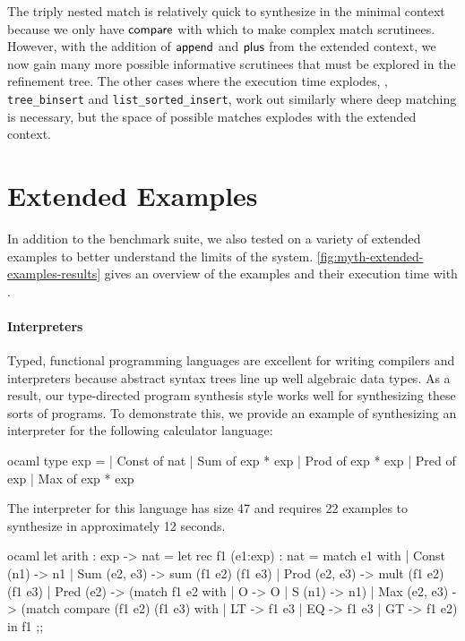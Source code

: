 The triply nested match is relatively quick to synthesize in the minimal context because we only have $\mathsf{compare}$ with which to make complex match scrutinees.
However, with the addition of $\mathsf{append}$ and $\mathsf{plus}$ from the extended context, we now gain many more possible informative scrutinees that must be explored in the refinement tree.
The other cases where the execution time explodes, \eg, \texttt{tree\_binsert} and \texttt{list\_sorted\_insert}, work out similarly where deep matching is necessary, but the space of possible matches explodes with the extended context.

\section{Extended Examples}
\label{sec:extended-examples}



In addition to the benchmark suite, we also tested \myth{} on a variety of extended examples to better understand the limits of the system.
\autoref{fig:myth-extended-examples-results} gives an overview of the examples and their execution time with \myth{}.

\paragraph{Interpreters}

Typed, functional programming languages are excellent for writing compilers and interpreters because abstract syntax trees line up well algebraic data types.
As a result, our type-directed program synthesis style works well for synthesizing these sorts of programs.
To demonstrate this, we provide an example of synthesizing an interpreter for the following calculator language:

\begin{center}
  \begin{cminted}{ocaml}
type exp =
| Const of nat
| Sum of exp * exp
| Prod of exp * exp
| Pred of exp
| Max of exp * exp
  \end{cminted}
\end{center}

The interpreter for this language has size 47 and requires 22 examples to synthesize in approximately 12 seconds.

\begin{center}
  \begin{cminted}{ocaml}
let arith : exp -> nat =
  let rec f1 (e1:exp) : nat =
    match e1 with
      | Const (n1) -> n1
      | Sum (e2, e3) -> sum (f1 e2) (f1 e3)
      | Prod (e2, e3) -> mult (f1 e2) (f1 e3)
      | Pred (e2) -> (match f1 e2 with
                        | O -> O
                        | S (n1) -> n1)
      | Max (e2, e3) -> (match compare (f1 e2) (f1 e3) with
                           | LT -> f1 e3
                           | EQ -> f1 e3
                           | GT -> f1 e2)
  in
    f1
;;
  \end{cminted}
\end{center}

